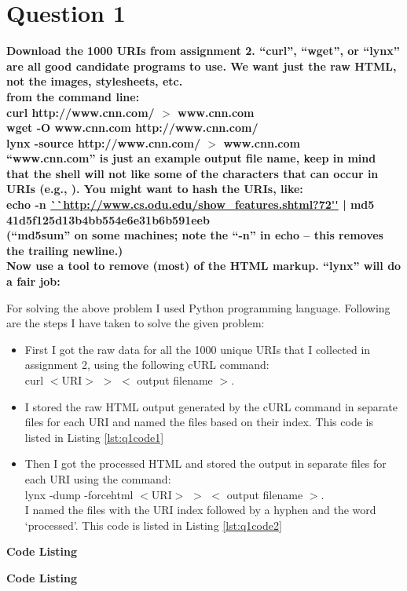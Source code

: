 \chapter{Question 1}
\label{intro}

\textbf{Download the 1000 URIs from assignment 2.  ``curl'', ``wget'', or ``lynx'' are all good candidate programs to use.  We want just the raw HTML, not the images, stylesheets, etc.\\
from the command line:\\
curl http://www.cnn.com/ $>$ www.cnn.com\\
wget -O www.cnn.com http://www.cnn.com/\\
lynx -source http://www.cnn.com/ $>$ www.cnn.com\\
``www.cnn.com'' is just an example output file name, keep in mind that the shell will not like some of the characters that can occur in URIs (e.g., ).  You might want to hash the URIs, like:\\
echo -n \url{``http://www.cs.odu.edu/show_features.shtml?72''} | md5
41d5f125d13b4bb554e6e31b6b591eeb\\
(``md5sum'' on some machines; note the ``-n'' in echo -- this removes the trailing newline.)\\ 
Now use a tool to remove (most) of the HTML markup.  ``lynx'' will do a fair job:}


For solving the above problem I used Python programming language. Following are the steps I have taken to solve the given problem:
\begin{itemize}
\item First I got the raw data for all the 1000 unique URIs that I collected in assignment 2, using the following  cURL command: \\
curl $<$URI$>$  $>$ $<$ output filename $>$.
\item I stored the raw HTML output generated by the cURL command in separate files for each URI and named the files based on their index. This code is listed in Listing \ref{lst:q1code1}
\item Then I got the processed HTML and stored the output in separate files for each URI using the command: \\
lynx -dump -force\textunderscore html $<$URI$>$ $>$ $<$ output filename $>$.\\
I named the files with the URI index followed by a hyphen and the word `processed'. This code is listed in Listing \ref{lst:q1code2}
\end{itemize}

\newpage
\textbf{Code Listing}


\textbf{Code Listing}
